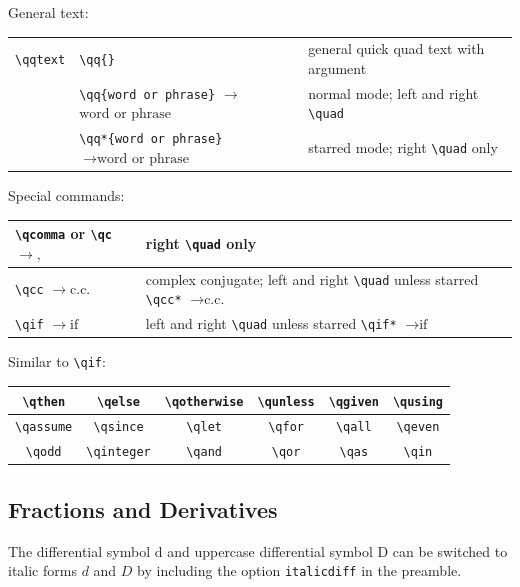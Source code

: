 \documentclass[a4paper,12pt]{article}
\begin{document}
General text:
\begin{longtable}[c]{|l|l|l|}
\hline
\verb|\qqtext| & \verb|\qq{}| & general quick quad text with argument \\
& \verb|\qq{word or phrase}| $\rightarrow$\Vtextvisiblespace[1em]$\text{word or phrase}$\Vtextvisiblespace[1em] & normal mode; left and right \verb|\quad| \\
& \verb|\qq*{word or phrase}| $\rightarrow \text{word or phrase}$\Vtextvisiblespace[1em] & starred mode; right \verb|\quad| only\\\hline
\end{longtable}
Special commands:
\begin{longtable}[c]{|l|l|}
\hline
\verb|\qcomma| or \verb|\qc| $\rightarrow ,$\Vtextvisiblespace[1em] & right \verb|\quad| only \\\hline
\verb|\qcc| $\rightarrow$\Vtextvisiblespace[1em]$\text{c.c.}$\Vtextvisiblespace[1em] & complex conjugate; left and right \verb|\quad| unless starred \verb|\qcc*| $\rightarrow \text{c.c.}$\Vtextvisiblespace[1em] \\\hline
\verb|\qif| $\rightarrow$\Vtextvisiblespace[1em]$\text{if}$\Vtextvisiblespace[1em] & left and right \verb|\quad| unless starred \verb|\qif*| $\rightarrow \text{if}$\Vtextvisiblespace[1em]\\\hline
\end{longtable}
Similar to \verb|\qif|:
\begin{longtable}[c]{|c|c|c|c|c|c|}
\hline
\verb|\qthen| & \verb|\qelse| & \verb|\qotherwise| & \verb|\qunless| & \verb|\qgiven| & \verb|\qusing| \\\hline
\verb|\qassume| & \verb|\qsince| & \verb|\qlet| & \verb|\qfor| & \verb|\qall| & \verb|\qeven| \\\hline
\verb|\qodd| & \verb|\qinteger| & \verb|\qand| & \verb|\qor| & \verb|\qas| & \verb|\qin| \\\hline
\end{longtable}
\subsection{Fractions and Derivatives}
The differential symbol $\mathrm{d}$ and uppercase differential symbol $\mathrm{D}$ can be switched to italic forms $d$ and $D$ by including the option \texttt{italicdiff} in the preamble.
\end{document}
